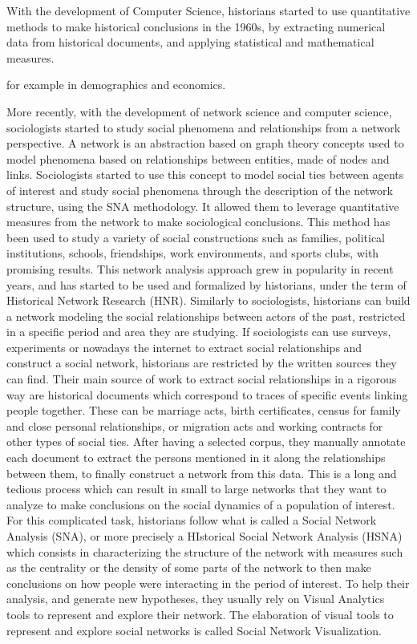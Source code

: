 With the development of Computer Science, historians started to use quantitative methods to make historical conclusions in the 1960s, by extracting numerical data from historical documents, and applying statistical and mathematical measures.

for example in demographics and economics.

More recently, with the development of network science and computer science, sociologists started to study social phenomena and relationships from a network perspective.
A network is an abstraction based on graph theory concepts used to model phenomena based on relationships between entities, made of nodes and links.
Sociologists started to use this concept to model social ties between agents of interest and study social phenomena through the description of the network structure, using the SNA methodology.
It allowed them to leverage quantitative measures from the network to make sociological conclusions.
This method has been used to study a variety of social constructions such as families, political institutions, schools, friendships, work environments, and sports clubs, with promising results.
This network analysis approach grew in popularity in recent years, and has started to be used and formalized by historians, under the term of Historical Network Research (HNR).
Similarly to sociologists, historians can build a network modeling the social relationships between actors of the past, restricted in a specific period and area they are studying.
If sociologists can use surveys, experiments or nowadays the internet to extract social relationships and construct a social network, historians are restricted by the written sources they can find.
Their main source of work to extract social relationships in a rigorous way are historical documents which correspond to traces of specific events linking people together.
These can be marriage acts, birth certificates, census for family and close personal relationships, or migration acts and working contracts for other types of social ties.
After having a selected corpus, they manually annotate each document to extract the persons mentioned in it along the relationships between them, to finally construct a network from this data.
This is a long and tedious process which can result in small to large networks that they want to analyze to make conclusions on the social dynamics of a population of interest.
For this complicated task, historians follow what is called a Social Network Analysis (SNA), or more precisely a HIstorical Social Network Analysis (HSNA) which consists in characterizing the structure of the network with measures such as the centrality or the density of some parts of the network to then make conclusions on how people were interacting in the period of interest. To help their analysis, and generate new hypotheses, they usually rely on Visual Analytics tools to represent and explore their network. The elaboration of visual tools to represent and explore social networks is called Social Network Visualization.

